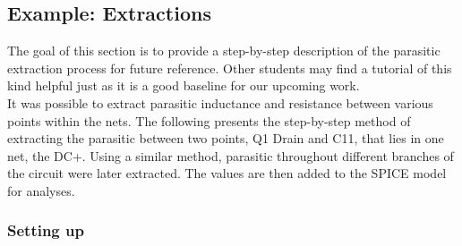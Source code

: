 \subsection{Example: Extractions}
\label{sec:extraction}

The goal of this section is to provide a step-by-step description of the parasitic extraction process for future reference. Other students may find a tutorial of this kind helpful just as it is a good baseline for our upcoming work. \\

It was possible to extract parasitic inductance and resistance between various points within the nets. The following presents the step-by-step method of extracting the parasitic between two points, Q1 Drain and C11, that lies in one net, the DC+. Using a similar method, parasitic throughout different branches of the circuit were later extracted. The values are then added to the SPICE model for analyses.\\

\subsubsection{Setting up}

